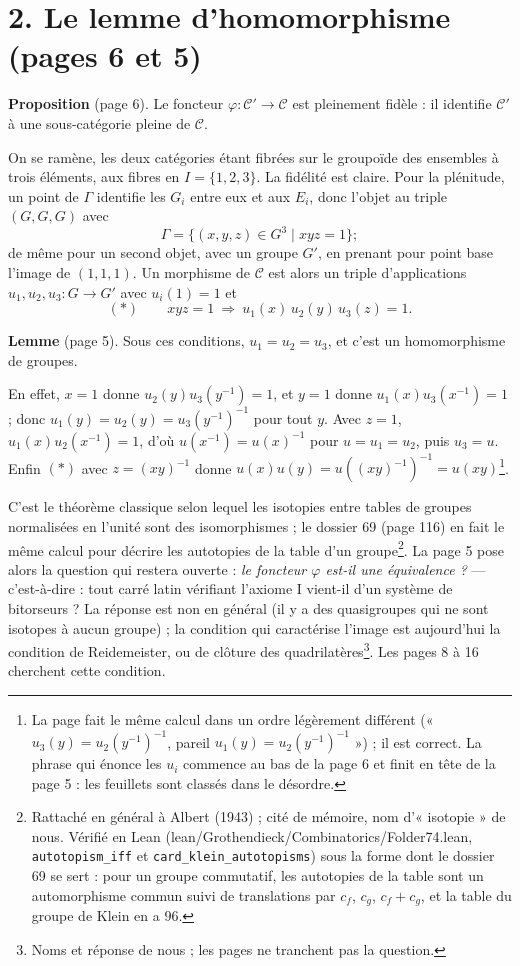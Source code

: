 \documentclass[11pt,a4paper]{article}
\begin{document}
\section*{2. Le lemme d'homomorphisme (pages 6 et 5)}

\textbf{Proposition} (page 6). Le foncteur $\varphi : \mathcal{C}' \to
\mathcal{C}$ est pleinement fidèle : il identifie $\mathcal{C}'$ à une
sous-catégorie pleine de $\mathcal{C}$.

On se ramène, les deux catégories étant fibrées sur le groupoïde des
ensembles à trois éléments, aux fibres en $I = \lbrace 1, 2, 3\rbrace$. La
fidélité est claire. Pour la plénitude, un point de $\Gamma$ identifie les
$G_i$ entre eux et aux $E_i$, donc l'objet au triple $(G, G, G)$ avec
\[
\Gamma = \lbrace (x, y, z) \in G^3 \mid xyz = 1\rbrace ;
\]
de même pour un second objet, avec un groupe $G'$, en prenant pour point
base l'image de $(1, 1, 1)$. Un morphisme de $\mathcal{C}$ est alors un
triple d'applications $u_1, u_2, u_3 : G \to G'$ avec $u_i(1) = 1$ et
\[
(*) \qquad xyz = 1 \ \Longrightarrow\ u_1(x)\, u_2(y)\, u_3(z) = 1 .
\]

\textbf{Lemme} (page 5). Sous ces conditions, $u_1 = u_2 = u_3$, et c'est un
homomorphisme de groupes.

En effet, $x = 1$ donne $u_2(y) u_3(y^{-1}) = 1$, et $y = 1$ donne $u_1(x)
u_3(x^{-1}) = 1$ ; donc $u_1(y) = u_2(y) = u_3(y^{-1})^{-1}$ pour tout $y$.
Avec $z = 1$, $u_1(x) u_2(x^{-1}) = 1$, d'où $u(x^{-1}) = u(x)^{-1}$ pour $u =
u_1 = u_2$, puis $u_3 = u$. Enfin $(*)$ avec $z = (xy)^{-1}$ donne $u(x)u(y) =
u((xy)^{-1})^{-1} = u(xy)$\footnote{La page fait le même calcul dans un ordre
légèrement différent (« $u_3(y) = u_2(y^{-1})^{-1}$, pareil $u_1(y) =
u_2(y^{-1})^{-1}$ ») ; il est correct. La phrase qui énonce les $u_i$ commence
au bas de la page 6 et finit en tête de la page 5 : les feuillets sont classés
dans le désordre.}.

C'est le théorème classique selon lequel les isotopies entre tables de groupes
normalisées en l'unité sont des isomorphismes ; le dossier 69 (page 116) en
fait le même calcul pour décrire les autotopies de la table d'un
groupe\footnote{Rattaché en général à Albert (1943) ; cité de mémoire, nom
d'« isotopie » de nous. Vérifié en Lean (lean/Grothendieck/Combinatorics/Folder74.lean,
\texttt{autotopism\_iff} et \texttt{card\_klein\_autotopisms}) sous la forme
dont le dossier 69 se sert : pour un groupe commutatif, les autotopies de la
table sont un automorphisme commun suivi de translations par $c_f$, $c_g$,
$c_f + c_g$, et la table du groupe de Klein en a $96$.}. La page 5 pose alors la question qui restera ouverte :
\emph{le foncteur $\varphi$ est-il une équivalence ?} --- c'est-à-dire : tout
carré latin vérifiant l'axiome I vient-il d'un système de bitorseurs ? La
réponse est non en général (il y a des quasigroupes qui ne sont isotopes à
aucun groupe) ; la condition qui caractérise l'image est aujourd'hui la
condition de Reidemeister, ou de clôture des quadrilatères\footnote{Noms et
réponse de nous ; les pages ne tranchent pas la question.}. Les pages 8 à 16
cherchent cette condition.
\end{document}
